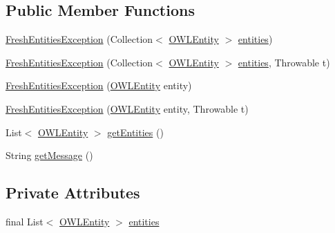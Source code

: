 \subsection*{Public Member Functions}
\begin{DoxyCompactItemize}
\item 
\hyperlink{classorg_1_1semanticweb_1_1owlapi_1_1reasoner_1_1_fresh_entities_exception_acb3bc891740d5f9f17a45ac8854df1ce}{Fresh\-Entities\-Exception} (Collection$<$ \hyperlink{interfaceorg_1_1semanticweb_1_1owlapi_1_1model_1_1_o_w_l_entity}{O\-W\-L\-Entity} $>$ \hyperlink{classorg_1_1semanticweb_1_1owlapi_1_1reasoner_1_1_fresh_entities_exception_a9a025a60031c37906a4df5df6dd5584e}{entities})
\item 
\hyperlink{classorg_1_1semanticweb_1_1owlapi_1_1reasoner_1_1_fresh_entities_exception_a74d702b757744a91a61728b2f68505a2}{Fresh\-Entities\-Exception} (Collection$<$ \hyperlink{interfaceorg_1_1semanticweb_1_1owlapi_1_1model_1_1_o_w_l_entity}{O\-W\-L\-Entity} $>$ \hyperlink{classorg_1_1semanticweb_1_1owlapi_1_1reasoner_1_1_fresh_entities_exception_a9a025a60031c37906a4df5df6dd5584e}{entities}, Throwable t)
\item 
\hyperlink{classorg_1_1semanticweb_1_1owlapi_1_1reasoner_1_1_fresh_entities_exception_a2c01a82609286aeb206baa6e91a70c07}{Fresh\-Entities\-Exception} (\hyperlink{interfaceorg_1_1semanticweb_1_1owlapi_1_1model_1_1_o_w_l_entity}{O\-W\-L\-Entity} entity)
\item 
\hyperlink{classorg_1_1semanticweb_1_1owlapi_1_1reasoner_1_1_fresh_entities_exception_ad067271ea5b423595feecdd121667c2d}{Fresh\-Entities\-Exception} (\hyperlink{interfaceorg_1_1semanticweb_1_1owlapi_1_1model_1_1_o_w_l_entity}{O\-W\-L\-Entity} entity, Throwable t)
\item 
List$<$ \hyperlink{interfaceorg_1_1semanticweb_1_1owlapi_1_1model_1_1_o_w_l_entity}{O\-W\-L\-Entity} $>$ \hyperlink{classorg_1_1semanticweb_1_1owlapi_1_1reasoner_1_1_fresh_entities_exception_af77fa2e3d19d42cbce1cb5c9e4220fb8}{get\-Entities} ()
\item 
String \hyperlink{classorg_1_1semanticweb_1_1owlapi_1_1reasoner_1_1_fresh_entities_exception_ac93a60597acc1163f5a84f3fd0dbe158}{get\-Message} ()
\end{DoxyCompactItemize}
\subsection*{Private Attributes}
\begin{DoxyCompactItemize}
\item 
final List$<$ \hyperlink{interfaceorg_1_1semanticweb_1_1owlapi_1_1model_1_1_o_w_l_entity}{O\-W\-L\-Entity} $>$ \hyperlink{classorg_1_1semanticweb_1_1owlapi_1_1reasoner_1_1_fresh_entities_exception_a9a025a60031c37906a4df5df6dd5584e}{entities}
\end{DoxyCompactItemize}
